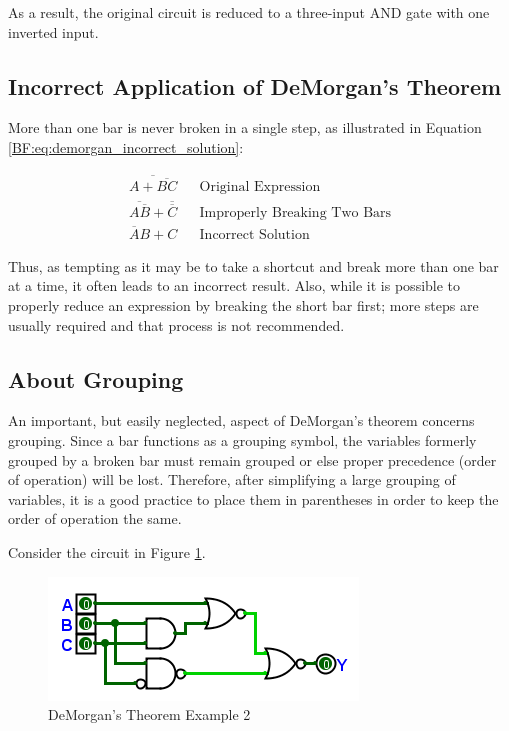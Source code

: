 As a result, the original circuit is reduced to a three-input \textsf{AND} gate with one inverted input.

\subsection{Incorrect Application of DeMorgan's Theorem}
\label{BF:subsec:incorrect_application_of_demorgans_theorem}

More than one bar is never broken in a single step, as illustrated in Equation \ref{BF:eq:demorgan_incorrect_solution}: 

\begin{align}
  \label{BF:eq:demorgan_incorrect_solution}
  \overline{A+\overline{BC}} && \text{Original Expression} \\
  \nonumber
  \overline{A\overline{B}}+\overline{\overline{C}} && \text{Improperly Breaking Two Bars} \\
  \nonumber
  \overline{A}B+C && \text{Incorrect Solution}
\end{align}

Thus, as tempting as it may be to take a shortcut and break more than one bar at a time, it often leads to an incorrect result. Also, while it is possible to properly reduce an expression by breaking the short bar first; more steps are usually required and that process is not recommended.  

\subsection{About Grouping}
\label{BF:subsec:demorgans_about_grouping}

An important, but easily neglected, aspect of DeMorgan's theorem concerns grouping. Since a bar functions as a grouping symbol, the variables formerly grouped by a broken bar must remain grouped or else proper precedence (order of operation) will be lost. Therefore, after simplifying a large grouping of variables, it is a good practice to place them in parentheses in order to keep the order of operation the same.  

Consider the circuit in Figure \ref{fig:04_30}.

\begin{figure}[H]
	\centering
	\includegraphics[width=\maxwidth{.95\linewidth}]{gfx/04_30}
	\caption{DeMorgan's Theorem Example 2}
	\label{fig:04_30}
\end{figure}

